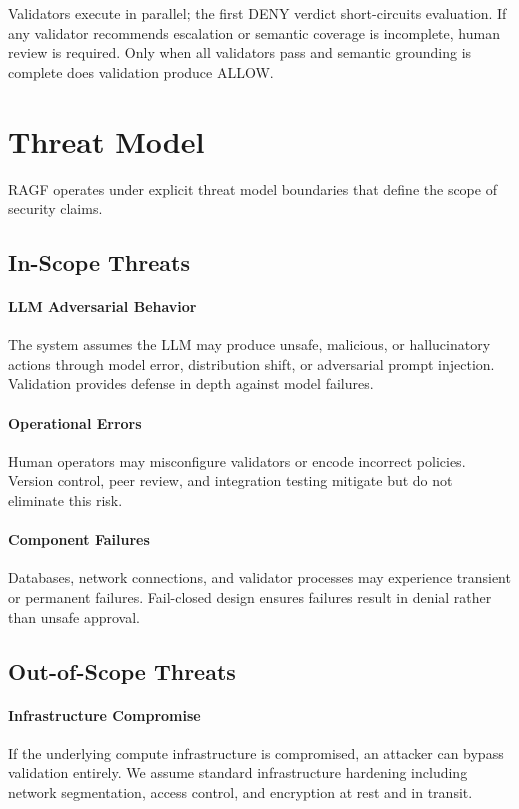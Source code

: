 \documentclass[sigconf,nonacm]{acmart}
\begin{document}
Validators execute in parallel; the first DENY verdict short-circuits evaluation. If any validator recommends escalation or semantic coverage is incomplete, human review is required. Only when all validators pass and semantic grounding is complete does validation produce ALLOW.

\section{Threat Model}
\label{sec:threat-model}

RAGF operates under explicit threat model boundaries that define the scope of security claims.

\subsection{In-Scope Threats}

\paragraph{LLM Adversarial Behavior} The system assumes the LLM may produce unsafe, malicious, or hallucinatory actions through model error, distribution shift, or adversarial prompt injection. Validation provides defense in depth against model failures.

\paragraph{Operational Errors} Human operators may misconfigure validators or encode incorrect policies. Version control, peer review, and integration testing mitigate but do not eliminate this risk.

\paragraph{Component Failures} Databases, network connections, and validator processes may experience transient or permanent failures. Fail-closed design ensures failures result in denial rather than unsafe approval.

\subsection{Out-of-Scope Threats}

\paragraph{Infrastructure Compromise} If the underlying compute infrastructure is compromised, an attacker can bypass validation entirely. We assume standard infrastructure hardening including network segmentation, access control, and encryption at rest and in transit.
\end{document}
